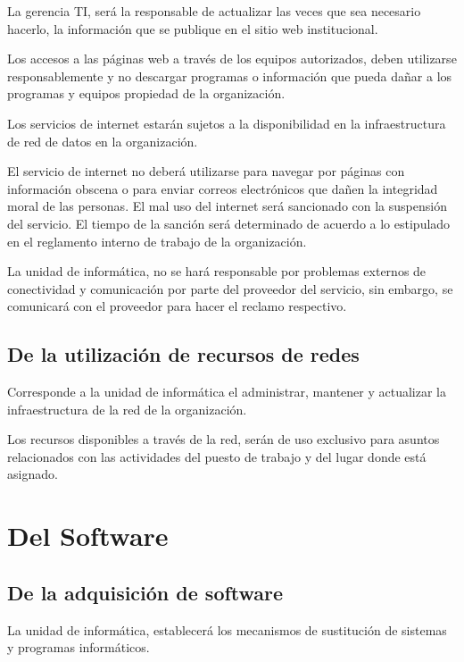 \documentclass{book}
\begin{document}
                La gerencia TI, será la responsable de actualizar las veces que sea necesario hacerlo,
                la información que se publique en el sitio web institucional.
                
                Los accesos a las páginas web a través de los equipos autorizados, deben
                utilizarse responsablemente y no descargar programas o información que pueda dañar a
                los programas y equipos propiedad de la organización.
                
                Los servicios de internet estarán sujetos a la disponibilidad en la infraestructura
                de red de datos en la organización.

                El servicio de internet no deberá utilizarse para navegar por páginas con
                información obscena o para enviar correos electrónicos que dañen la integridad moral
                de las personas. El mal uso del internet será sancionado con la suspensión del servicio.
                El tiempo de la sanción será determinado de acuerdo a lo estipulado en el reglamento
                interno de trabajo de la organización.

                La unidad de informática, no se hará responsable por problemas externos de
                conectividad y comunicación por parte del proveedor del servicio, sin embargo, se
                comunicará con el proveedor para hacer el reclamo respectivo.
            \

            \subsection{De la utilización de recursos de redes}
                Corresponde a la unidad de informática el administrar, mantener y actualizar la
                infraestructura de la red de la organización.
                
                Los recursos disponibles a través de la red, serán de uso exclusivo para asuntos
                relacionados con las actividades del puesto de trabajo y del lugar donde está asignado.
            \
        \

        \section{Del Software}
            \subsection{De la adquisición de software}
                La unidad de informática, establecerá los mecanismos de sustitución de sistemas
                y programas informáticos.
\end{document}
